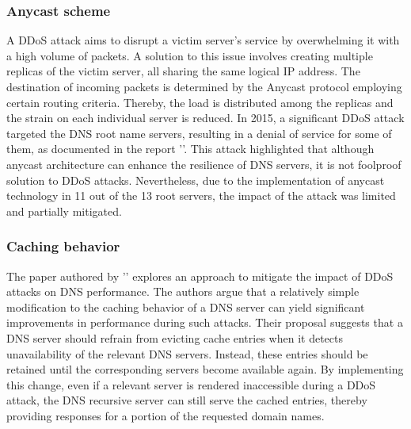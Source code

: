 \subsubsection*{Anycast scheme}
A DDoS attack aims to disrupt a victim server's service by overwhelming it with a high volume of packets. A solution to this issue involves 
creating multiple replicas of the victim server, all sharing the same logical IP address. The destination of 
incoming packets is determined by the Anycast protocol employing certain routing criteria. Thereby, the load is distributed among the replicas 
and the strain on each individual server is reduced.
In 2015, a significant DDoS attack targeted the DNS root name servers, resulting in a denial of service for some of them, as documented in the report '\cite{anycast}'. 
This attack highlighted that although anycast architecture can enhance the resilience of DNS servers, it is not foolproof solution to DDoS attacks. 
Nevertheless, due to the implementation of anycast technology in 11 out of the 13 root servers, the impact of the attack was limited and partially mitigated.

\subsubsection*{Caching behavior}
The paper authored by '\cite{alleviatingimpact}' explores an approach to mitigate the impact of DDoS attacks on DNS performance. 
The authors argue that a relatively simple modification to the caching behavior of a DNS server can yield significant 
improvements in performance during such attacks.
Their proposal suggests that a DNS server should refrain from evicting cache entries when it detects unavailability of the relevant DNS servers. 
Instead, these entries should be retained until the corresponding servers become available again. By implementing this change, even if a relevant 
server is rendered inaccessible during a DDoS attack, the DNS recursive server can still serve the cached entries, thereby providing responses for 
a portion of the requested domain names.


